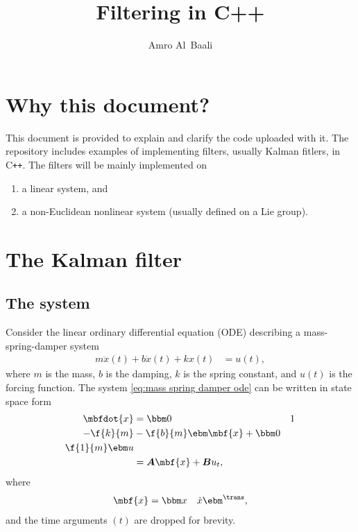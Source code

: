 \documentclass[nobib]{tufte-handout}
\title{Filtering in C++}
\author{Amro Al~Baali}
\newcommand{\cpp}{C\texttt{++}}
\begin{document}
    {    
        
        \tableofcontents
        \clearpage
    }

    \section{Why this document?}
    This document is provided to explain and clarify the code uploaded with it. The repository includes examples of implementing filters, usually Kalman fitlers, in \cpp. The filters will be mainly implemented on 
    \begin{enumerate}
        \item a linear system, and
        \item a non-Euclidean nonlinear system (usually defined on a Lie group).
    \end{enumerate}

    \section{The Kalman filter}
    \subsection{The system}
    Consider the linear ordinary differential equation (ODE) describing a mass-spring-damper system
    \begin{align}
        \label{eq:mass spring damper ode}
        m\ddot{x}(t) + b\dot{x}(t) + kx(t) &= u(t),
    \end{align}
    where $m$ is the mass, $b$ is the damping, $k$ is the spring constant, and $u(t)$ is the forcing function. The system \eqref{eq:mass spring damper ode} can be written in state space form
    \begin{align}
        \mbfdot{x} &= \bbm 0 & 1\\ -\f{k}{m} & -\f{b}{m} \ebm \mbf{x} + \bbm 0\\\f{1}{m} \ebm u\\
        &= \boldsymbol{A}\mbf{x} + \boldsymbol{B}u_{t},
    \end{align}
    where 
    \begin{align}
        \label{eq:DT linear kinematic model}
        \mbf{x} &= \bbm x & \dot{x} \ebm^{\trans},
    \end{align}
    and the time arguments $(t)$ are dropped for brevity.
\end{document}
